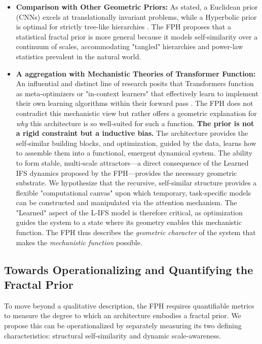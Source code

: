 \documentclass[11pt,a4paper]{article}
\begin{document}
\begin{itemize}
    \item \textbf{Comparison with Other Geometric Priors:} As stated, a Euclidean prior (CNNs) excels at translationally invariant problems, while a Hyperbolic prior is optimal for strictly tree-like hierarchies \citep{nickel2017poincare}. The FPH proposes that a statistical fractal prior is more general because it models self-similarity over a continuum of scales, accommodating "tangled" hierarchies and power-law statistics prevalent in the natural world.

    \item \textbf{A aggregation with Mechanistic Theories of Transformer Function:} An influential and distinct line of research posits that Transformers function as  meta-optimizers or "in-context learners" that effectively learn to implement their own learning algorithms within their forward pass \citep{garg2022what, vonoswald2023transformers}. The FPH does not contradict this mechanistic view but rather offers a geometric explanation for \textit{why} this architecture is so well-suited for such a function. \textbf{The prior is not a rigid constraint but a  inductive bias.} The architecture provides the self-similar building blocks, and optimization, guided by the data, learns how to assemble them into a functional, emergent dynamical system. The ability to form stable, multi-scale attractors—a direct consequence of the Learned IFS dynamics proposed by the FPH—provides the necessary geometric substrate. We hypothesize that the recursive, self-similar structure provides a flexible "computational canvas" upon which temporary, task-specific models can be constructed and manipulated via the attention mechanism. The "Learned" aspect of the L-IFS model is therefore critical, as optimization guides the system to a state where its geometry enables this  mechanistic function. The FPH thus describes the \textit{geometric character} of the system that makes the \textit{mechanistic function} possible.
\end{itemize}

\subsection{Towards Operationalizing and Quantifying the Fractal Prior}
To move beyond a qualitative description, the FPH requires quantifiable metrics to measure the degree to which an architecture embodies a fractal prior. We propose this can be operationalized by separately measuring its two defining characteristics: structural self-similarity and dynamic scale-awareness.
\end{document}
